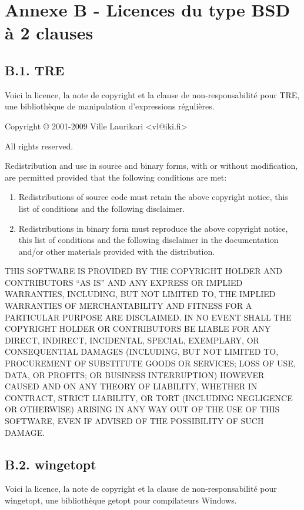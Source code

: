 \chapter*{Annexe B - Licences du type BSD à 2 clauses}


\section*{B.1. TRE}
Voici la licence, la note de copyright et la clause de non-responsabilité pour TRE,
une bibliothèque de manipulation d'expressions régulières.

\bigskip
\noindent Copyright © 2001-2009 Ville Laurikari <vl@iki.fi>

\noindent All rights reserved.

\bigskip
\noindent Redistribution and use in source and binary forms, with or without
modification, are permitted provided that the following conditions
are met:

\begin{enumerate}
  \item 
  Redistributions of source code must retain the above copyright
     notice, this list of conditions and the following disclaimer.

\item 
  Redistributions in binary form must reproduce the above copyright
     notice, this list of conditions and the following disclaimer in the
     documentation and/or other materials provided with the distribution.
\end{enumerate}

\noindent THIS SOFTWARE IS PROVIDED BY THE COPYRIGHT HOLDER AND CONTRIBUTORS
``AS IS'' AND ANY EXPRESS OR IMPLIED WARRANTIES, INCLUDING, BUT NOT
LIMITED TO, THE IMPLIED WARRANTIES OF MERCHANTABILITY AND FITNESS FOR
A PARTICULAR PURPOSE ARE DISCLAIMED.  IN NO EVENT SHALL THE COPYRIGHT
HOLDER OR CONTRIBUTORS BE LIABLE FOR ANY DIRECT, INDIRECT, INCIDENTAL,
SPECIAL, EXEMPLARY, OR CONSEQUENTIAL DAMAGES (INCLUDING, BUT NOT
LIMITED TO, PROCUREMENT OF SUBSTITUTE GOODS OR SERVICES; LOSS OF USE,
DATA, OR PROFITS; OR BUSINESS INTERRUPTION) HOWEVER CAUSED AND ON ANY
THEORY OF LIABILITY, WHETHER IN CONTRACT, STRICT LIABILITY, OR TORT
(INCLUDING NEGLIGENCE OR OTHERWISE) ARISING IN ANY WAY OUT OF THE USE
OF THIS SOFTWARE, EVEN IF ADVISED OF THE POSSIBILITY OF SUCH DAMAGE.


\section*{B.2. wingetopt}
Voici la licence, la note de copyright et la clause de non-responsabilité pour wingetopt,
une bibliothèque getopt pour compilateurs Windows.

